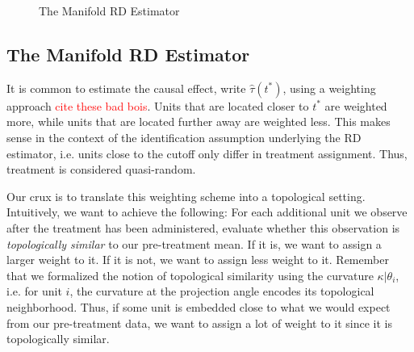 \documentclass[twoside,11pt]{article}
\begin{document}
\begin{figure}[h!]
\begin{center}
  \end{center}
  \caption{The Manifold RD Estimator}\label{fig:manifold-rd}
\end{figure}

\subsection{The Manifold RD Estimator}

It is common to estimate the causal effect, write $\hat{\tau}(t^*)$, using a weighting approach \textcolor{red}{cite these bad bois}. Units that are located closer to $t^*$ are weighted more, while units that are located further away are weighted less. This makes sense in the context of the identification assumption underlying the RD estimator, i.e. units close to the cutoff only differ in treatment assignment. Thus, treatment is considered quasi-random. 

Our crux is to translate this weighting scheme into a topological setting. Intuitively, we want to achieve the following: For each additional unit we observe after the treatment has been administered, evaluate whether this observation is \textit{topologically similar} to our pre-treatment mean. If it is, we want to assign a larger weight to it. If it is not, we want to assign less weight to it. Remember that we formalized the notion of topological similarity using the curvature $\kappa|\theta_i$, i.e. for unit $i$, the curvature at the projection angle encodes its topological neighborhood. Thus, if some unit is embedded close to what we would expect from our pre-treatment data, we want to assign a lot of weight to it since it is topologically similar. 
\end{document}
